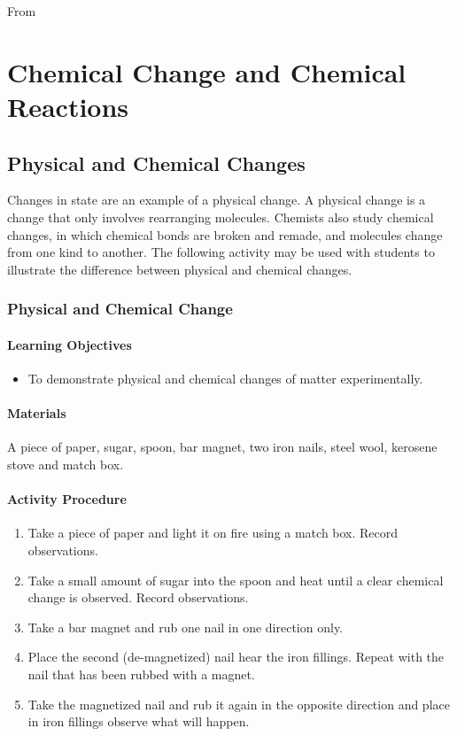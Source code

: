 From \chapter{Chemical Change and Chemical Reactions}


\section{Physical and Chemical Changes}

Changes in state are an example of a physical change. A physical change is a change that only involves rearranging molecules. Chemists also study chemical changes, in which chemical bonds are broken and remade, and molecules change from one kind to another. The following activity may be used with students to illustrate the difference between physical and chemical changes.

\subsection{Physical and Chemical Change}

\subsubsection*{Learning Objectives}
\begin{itemize}
\item{To demonstrate physical and chemical changes of matter experimentally.}
\end{itemize}


\subsubsection*{Materials}
A piece of paper, sugar, spoon, bar magnet, two iron nails, steel wool, kerosene stove and match box.

\subsubsection*{Activity Procedure}
\begin{enumerate}
\item{Take a piece of paper and light it on fire using a match box. Record observations.}
\item{Take a small amount of sugar into the spoon and heat until a clear chemical change is observed. Record  observations.}
\item{Take a bar magnet and rub one nail in one direction only.}
\item{ Place the second (de-magnetized) nail hear the iron fillings. Repeat with the nail that has been rubbed with a magnet.}
\item{Take the magnetized nail and rub it again in the opposite direction and place in iron fillings observe what will happen.}
\end{enumerate}

